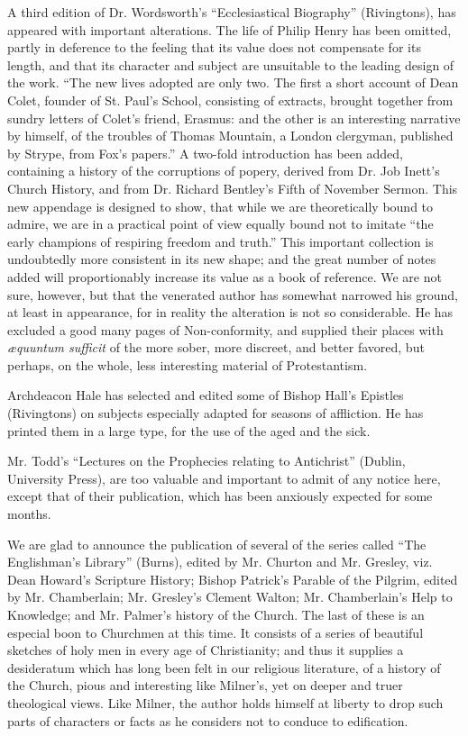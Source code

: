 A third edition of Dr. Wordsworth's ``Ecclesiastical Biography''
(Rivingtons), has appeared with important
alterations. The life of Philip Henry has been omitted, partly in
deference to the feeling that its value does not compensate for its
length, and that its character and subject are unsuitable to the leading
design of the work. ``The new lives adopted are only two. The first a
short account of Dean Colet, founder of St. Paul's School, consisting
of extracts, brought together from sundry letters of Colet's friend,
Erasmus: and the other is an interesting narrative by himself, of the
troubles of Thomas Mountain, a London clergyman, published by Strype,
from Fox's papers.'' A two-fold introduction has been added,
containing a history of the corruptions of popery, derived from Dr. Job
Inett's Church History, and from Dr. Richard Bentley's Fifth of
November Sermon. This new appendage is designed to show, that while we
are theoretically bound to admire, we are in a practical point of view
equally bound not to imitate ``the early champions of respiring freedom
and truth.'' This important collection is undoubtedly more consistent
in its new shape; and the great number of notes added will
proportionably increase its value as a book of reference. We are not
sure, however, but that the venerated author has somewhat narrowed his
ground, at least in appearance, for in reality the alteration is not so
considerable. He has excluded a good many pages of Non-conformity, and
supplied their places with \emph{æquuntum sufficit} of the more sober,
more discreet, and better favored, but perhaps, on the whole, less
interesting material of Protestantism.

Archdeacon Hale has selected and edited some of
Bishop Hall's Epistles (Rivingtons) on subjects especially adapted for
seasons of affliction. He has printed them in a large type, for the use
of the aged and the sick.

Mr. Todd's ``Lectures on the Prophecies relating
to Antichrist'' (Dublin, University Press), are too valuable and
important to admit of any notice here, except that of their publication,
which has been anxiously expected for some months.

We are glad to announce the publication of several
of the series called ``The Englishman's Library'' (Burns), edited by
Mr. Churton and Mr. Gresley, viz. Dean Howard's Scripture History;
Bishop Patrick's Parable of the Pilgrim, edited by Mr. Chamberlain;
Mr. Gresley's Clement Walton; Mr. Chamberlain's Help to Knowledge;
and Mr. Palmer's history of the Church. The last of these is an
especial boon to Churchmen at this time. It consists of a series of
beautiful sketches of holy men in every age of Christianity; and thus it
supplies a desideratum which has long been felt in our religious
literature, of a history of the Church, pious and interesting like
Milner's, yet on deeper and truer theological views. Like Milner, the
author holds himself at liberty to drop such parts of characters or
facts as he considers not to conduce to edification.

